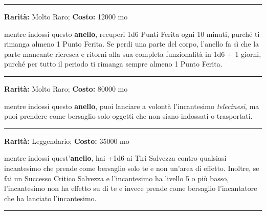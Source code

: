 \begin{multicols}{2}
\medskip

\smallskip\noindent\rule{\linewidth}{2pt}  \hypertarget{AnellodiRigenerazione}{}\smallskip{}\noindent\label{AnellodiRigenerazione}

\textbf{Rarità:} Molto Raro; \textbf{Costo:} 12000 mo

mentre indossi questo \textbf{anello}, recuperi 1d6 Punti Ferita ogni 10 minuti, purché ti rimanga almeno 1 Punto Ferita. Se perdi una parte del corpo, l'anello fa sì che la parte mancante ricresca e ritorni alla sua completa funzionalità in 1d6 + 1 giorni, purché per tutto il periodo ti rimanga sempre almeno 1 Punto Ferita.

\smallskip\noindent\rule{\linewidth}{2pt}  \hypertarget{AnellodiTelecinesi}{}\smallskip{}\noindent\label{AnellodiTelecinesi}

\textbf{Rarità:} Molto Raro; \textbf{Costo:} 80000 mo

mentre indossi questo \textbf{anello}, puoi lanciare a volontà l'incantesimo \emph{telecinesi}, ma puoi prendere come bersaglio solo oggetti che non siano indossati o trasportati.

\smallskip\noindent\rule{\linewidth}{2pt}  \hypertarget{AnelloRespingiIncantesimi}{}\smallskip{}\noindent\label{AnelloRespingiIncantesimi}

\textbf{Rarità:} Leggendario; \textbf{Costo:} 35000 mo

mentre indossi quest'\textbf{anello}, hai +1d6 ai Tiri Salvezza contro qualsiasi incantesimo che prende come bersaglio solo te e non un'area di effetto. Inoltre, se fai un Successo Critico Salvezza e l'incantesimo ha livello 5 o più basso, l'incantesimo non ha effetto su di te e invece prende come bersaglio l'incantatore che ha lanciato l'incantesimo.

\smallskip\noindent\rule{\linewidth}{2pt}  \hypertarget{Anforaelementaledell'acqua}{}\smallskip{}\noindent\label{Anforaelementaledell'acqua}


\end{multicols}
